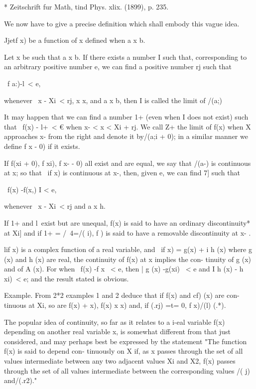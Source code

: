 * Zeitschrift fur Math, tind Phys. xlix. (1899), p. 235.

%
%

We now have to give a precise definition which shall embody this vague
idea.

Jjetf x) be a function of x defined when a x b.

Let x be such that a x b. If there exists a number I such that,
corresponding to an arbitrary positive number e, we can find a
positive number rj such that

\ f a:)-l\ < e,

whenever \ x - Xi\ < rj, x x, and a x b, then I is called the limit
of /(a;)

It may happen that we can find a number 1+ (even when I does not
exist) such that \ f(x) - l+\ < € when x- < x < Xi + rj. We call Z+
the limit of f(x) when X approaches x- from the right and denote it
by/(a;i + 0); in a similar manner we define f x - 0) if it exists.

If f(xi + 0), f xi), f x- - 0) all exist and are equal, we say that
/(a-) is continuous at x; so that \ if x) is continuous at x-, then,
given e, we can find 7] such that

\ f(x) -f(x,) I < e,

whenever \ x - Xi\ < rj and a x h.

If 1+ and l\ exist but are unequal, f(x) is said to have an ordinary
discontinuity* at Xi] and if 1+ = /\ 4=/( i), f ) is said to have a
removable discontinuity at x- .

lif x) is a complex function of a real variable, and \ if x) = g(x) +
i h (x) where g (x) and h (x) are real, the continuity of f(x) at x
implies the con- tinuity of g (x) and of A (x). For when \ f(x) -f x \
< e, then | g (x) -g(xi) \ < e and I h (x) - h xi)\ < e; and the
result stated is obvious.

Example. From 2*2 examples 1 and 2 deduce that if f(x) and cf) (x) are
con- tinuous at Xi, so are f(x) + x), f(x) x x) and, if (.rj) =t= 0,
f x)/(l) (.*).

The popular idea of continuity, so far as it relates to a i-eal
variable f(x) depending on another real variable x, is somewhat
different from that just considered, and may perhaps best be expressed
by the statement "The function f(x) is said to depend con- tinuously
on X if, as x passes through the set of all values intermediate
between any two adjacent values Xi and X2, f(x) passes through the set
of all values intermediate between the corresponding values /( j)
and/(.r2)."

